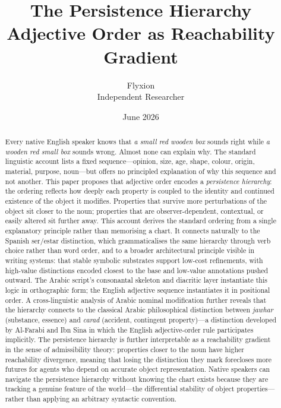 \documentclass[11pt]{article}
\title{\textbf{The Persistence Hierarchy}\\[6pt]
\large Adjective Order as Reachability Gradient}
\author{Flyxion\\[4pt]
\small Independent Researcher}
\date{June 2026}
\theoremstyle{rthm}
\theoremstyle{rdef}
\theoremstyle{remark}
\begin{document}
\maketitle
\thispagestyle{empty}

\begin{abstract}
\noindent
Every native English speaker knows that \emph{a small red wooden box} sounds
right while \emph{a wooden red small box} sounds wrong. Almost none can
explain why. The standard linguistic account lists a fixed sequence---opinion,
size, age, shape, colour, origin, material, purpose, noun---but offers no
principled explanation of why this sequence and not another. This paper
proposes that adjective order encodes a \emph{persistence hierarchy}: the
ordering reflects how deeply each property is coupled to the identity and
continued existence of the object it modifies. Properties that survive more
perturbations of the object sit closer to the noun; properties that are
observer-dependent, contextual, or easily altered sit further away. This
account derives the standard ordering from a single explanatory principle
rather than memorising a chart. It connects naturally to the Spanish
ser/estar distinction, which grammaticalises the same hierarchy through
verb choice rather than word order, and to a broader architectural
principle visible in writing systems: that stable symbolic substrates
support low-cost refinements, with high-value distinctions encoded closest
to the base and low-value annotations pushed outward. The Arabic script's
consonantal skeleton and diacritic layer instantiate this logic in
orthographic form; the English adjective sequence instantiates it in
positional order. A cross-linguistic analysis of Arabic nominal modification
further reveals that the hierarchy connects to the classical Arabic
philosophical distinction between \textit{jawhar} (substance, essence)
and \textit{carad} (accident, contingent property)---a distinction developed
by Al-Farabi and Ibn Sina in which the English adjective-order rule
participates implicitly. The persistence hierarchy is further interpretable
as a reachability gradient in the sense of admissibility theory: properties
closer to the noun have higher reachability divergence, meaning that losing
the distinction they mark forecloses more futures for agents who depend on
accurate object representation. Native speakers can navigate the persistence
hierarchy without knowing the chart exists because they are tracking a
genuine feature of the world---the differential stability of object
properties---rather than applying an arbitrary syntactic convention.
\end{abstract}
\end{document}

